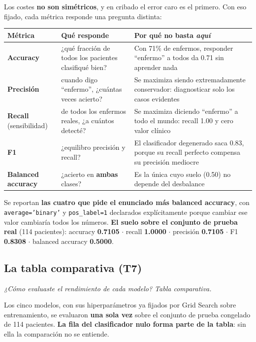 \documentclass[10pt,a4paper]{article}
\begin{document}
Los costes \textbf{no son simétricos}, y en cribado el error caro es el primero. Con eso fijado, cada métrica responde una pregunta distinta:

\begin{table}[H]
\footnotesize
\begin{tabularx}{\textwidth}{@{}l l X@{}}
\toprule
\textbf{Métrica} & \textbf{Qué responde} & \textbf{Por qué no basta \textit{aquí}} \\
\midrule
\textbf{Accuracy} & ¿qué fracción de todos los pacientes clasifiqué bien? & Con 71\% de enfermos, responder ``enfermo'' a todos da 0.71 sin aprender nada \\
\textbf{Precisión} & cuando digo ``enfermo'', ¿cuántas veces acierto? & Se maximiza siendo extremadamente conservador: diagnosticar solo los casos evidentes \\
\textbf{Recall} (sensibilidad) & de todos los enfermos reales, ¿a cuántos detecté? & Se maximiza diciendo ``enfermo'' a todo el mundo: recall 1.00 y cero valor clínico \\
\textbf{F1} & ¿equilibro precisión y recall? & El clasificador degenerado saca 0.83, porque su recall perfecto compensa su precisión mediocre \\
\textbf{Balanced accuracy} & ¿acierto en \textbf{ambas} clases? & Es la única cuyo suelo (0.50) no depende del desbalance \\
\bottomrule
\end{tabularx}
\end{table}

Se reportan \textbf{las cuatro que pide el enunciado más balanced accuracy}, con \texttt{average='binary'} y \texttt{pos\_label=1} declarados explícitamente porque cambiar ese valor cambiaría todos los números. \textbf{El suelo sobre el conjunto de prueba real} (114 pacientes): accuracy \textbf{0.7105} $\cdot$ recall \textbf{1.0000} $\cdot$ precisión \textbf{0.7105} $\cdot$ F1 \textbf{0.8308} $\cdot$ balanced accuracy \textbf{0.5000}.

\subsection{La tabla comparativa (T7)}

\textit{¿Cómo evaluaste el rendimiento de cada modelo? Tabla comparativa.}

Los cinco modelos, con sus hiperparámetros ya fijados por Grid Search sobre entrenamiento, se evaluaron \textbf{una sola vez} sobre el conjunto de prueba congelado de 114 pacientes. \textbf{La fila del clasificador nulo forma parte de la tabla}: sin ella la comparación no se entiende.
\end{document}
